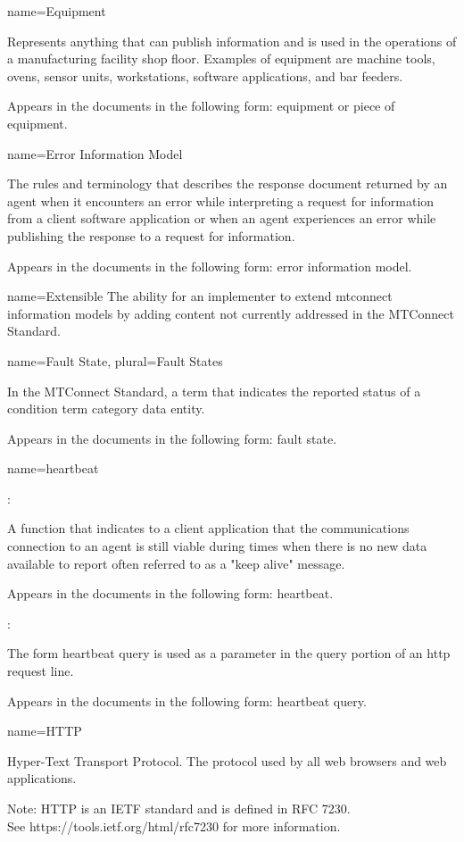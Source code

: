 {
  name={Equipment}
}
{
	Represents anything that can publish information and is used in the operations of a manufacturing facility shop floor.  Examples of equipment are machine tools, ovens, sensor units, workstations, software applications, and bar feeders.

	Appears in the documents in the following form: equipment or piece of equipment.
}


{
  name={Error Information Model}
}
{
	The rules and terminology that describes the \gls{response document} returned by an \gls{agent} when it encounters an error while interpreting a \gls{request} for information from a client software application or when an \gls{agent} experiences an error while publishing the \gls{response} to a \gls{request} for information.

	Appears in the documents in the following form: \gls{error information model}.
}


{
  name={Extensible}
}
{
	The ability for an implementer to extend \glspl{mtconnect information model} by adding content not currently addressed in the MTConnect Standard.
}


{
  name={Fault State},
  plural={Fault States}
}
{
	In the MTConnect Standard, a term that indicates the reported status of a \gls{condition term} category \gls{data entity}.   

	Appears in the documents in the following form: \gls{fault state}.
}


{
  name={heartbeat}
}
{
	:

	A function that indicates to a client application that the communications connection to an \gls{agent} is still viable during times when there is no new data available to report  often referred to as a "keep alive" message.

	Appears in the documents in the following form: \gls{heartbeat}.

	:

	The form \gls{heartbeat query} is used as a parameter in the query portion of an \gls{http request line}.

	Appears in the documents in the following form: \gls{heartbeat query}.
}


{
  name={\normalfont HTTP}
}
{
	Hyper-Text Transport Protocol.  The protocol used by all web browsers and web applications.

    \begin{note}
	Note:  HTTP is an IETF standard and is defined in RFC 7230. \\ See https://tools.ietf.org/html/rfc7230 for more information.
	\end{note}
}


